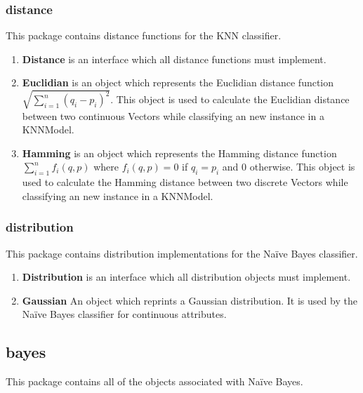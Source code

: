 \documentclass[11pt]{article}
\newcommand{\bb}{\textbf}
\begin{document}
\subsubsection{distance}
This package contains distance functions for the KNN classifier.

\begin{enumerate}[leftmargin=*]
  \item[] \bb{Distance} is an interface which all distance functions must implement.
  \item[] \bb{Euclidian} is an object which represents the Euclidian distance function $\sqrt{\sum_{i=1}^{n}(q_i-p_i)^2}$. This object is used to calculate the Euclidian distance between two continuous Vectors while classifying an new instance in a KNNModel.
  \item[] \bb{Hamming} is an object which represents the Hamming distance function $\sum_{i=1}^{n}f_i(q, p)$ where $f_i(q, p) = 0$ if $q_i = p_i$ and $0$ otherwise. This object is used to calculate the Hamming distance between two discrete Vectors while classifying an new instance in a KNNModel.
\end{enumerate}

\subsubsection{distribution}
This package contains distribution implementations for the Naïve Bayes classifier.

\begin{enumerate}[leftmargin=*]
  \item[] \bb{Distribution} is an interface which all distribution objects must implement.
  \item[] \bb{Gaussian} An object which reprints a Gaussian distribution. It is used by the Naïve Bayes classifier for continuous attributes.
\end{enumerate}

\subsection{bayes}
This package contains all of the objects associated with Naïve Bayes.
\end{document}
